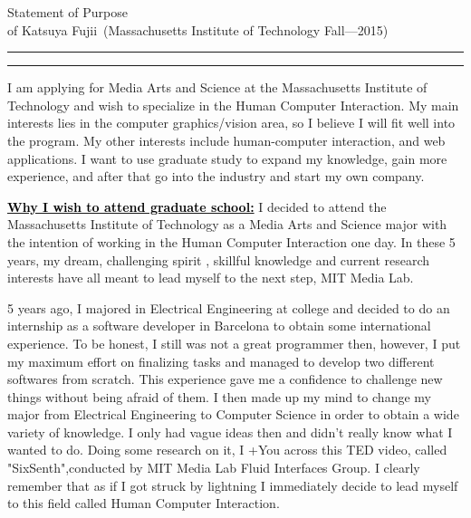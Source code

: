 \documentclass{article}
\newcommand{\soptitle}{Statement of Purpose}
\newcommand{\yourname}{Katsuya Fujii}
\newcommand{\statement}[1]{\par\medskip
  \underline{\textcolor{black}{\textbf{#1:}}}\space
}
\begin{document}
\begin{center}\LARGE\soptitle\\
\large of \yourname\ (Massachusetts Institute of Technology Fall---2015)
\end{center}

\hrule
\vspace{1pt}
\hrule height 1pt

\bigskip


I am applying for Media Arts and Science at the Massachusetts Institute of Technology and wish to specialize in the Human Computer Interaction. My main interests lies in the computer graphics/vision area, so I believe I will fit well into the program. My other interests include human-computer interaction, and web applications. I want to use graduate study to expand my knowledge, gain more experience, and after that go into the industry and start my own company.

\statement{Why I wish to attend graduate school} I decided to attend the Massachusetts Institute of Technology as a Media Arts and Science major with the intention of working in the Human Computer Interaction one day. In these 5 years, my dream, challenging spirit , skillful knowledge and current research interests have all meant to lead myself to the next step, MIT Media Lab.

5 years ago, I majored in Electrical Engineering at college and decided to do an internship as a software developer in Barcelona to obtain some international experience.  To be honest, I still was not a great programmer then, however, I put my maximum effort on finalizing tasks and managed to develop two different softwares from scratch. This experience gave me a confidence to challenge new things without being afraid of them. I then made up my mind to change my major from Electrical Engineering to Computer Science in order to obtain a wide variety of knowledge. I only had vague ideas then and didn't really know what I wanted to do. Doing some research on it, I +You across this TED video, called "SixSenth",conducted by MIT Media Lab Fluid Interfaces Group. I clearly remember that as if I got struck by lightning I immediately decide to lead myself to this field called Human Computer Interaction. 
\end{document}
